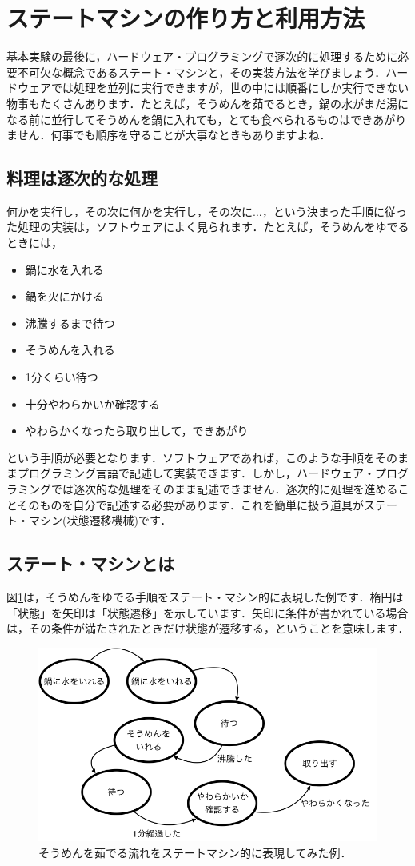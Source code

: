 \documentclass[a4paper,dvipdfmx]{jsarticle}
\begin{document}
\section{ステートマシンの作り方と利用方法}
基本実験の最後に，ハードウェア・プログラミングで逐次的に処理するために必要不可欠な概念であるステート・マシンと，その実装方法を学びましょう．ハードウェアでは処理を並列に実行できますが，世の中には順番にしか実行できない物事もたくさんあります．たとえば，そうめんを茹でるとき，鍋の水がまだ湯になる前に並行してそうめんを鍋に入れても，とても食べられるものはできあがりません．何事でも順序を守ることが大事なときもありますよね．

\subsection{料理は逐次的な処理}

何かを実行し，その次に何かを実行し，その次に...，という決まった手順に従った処理の実装は，ソフトウェアによく見られます．たとえば，そうめんをゆでるときには，
\begin{itemize}
 \item 鍋に水を入れる
 \item 鍋を火にかける
 \item 沸騰するまで待つ
 \item そうめんを入れる
 \item 1分くらい待つ
 \item 十分やわらかいか確認する
 \item やわらかくなったら取り出して，できあがり
\end{itemize}
という手順が必要となります．ソフトウェアであれば，このような手順をそのままプログラミング言語で記述して実装できます．しかし，ハードウェア・プログラミングでは逐次的な処理をそのまま記述できません．逐次的に処理を進めることそのものを自分で記述する必要があります．これを簡単に扱う道具がステート・マシン(状態遷移機械)です．

\subsection{ステート・マシンとは}
図\ref{fig:statemachine_example}は，そうめんをゆでる手順をステート・マシン的に表現した例です．楕円は「状態」を矢印は「状態遷移」を示しています．矢印に条件が書かれている場合は，その条件が満たされたときだけ状態が遷移する，ということを意味します．

 \begin{figure}[H]
  \begin{center}
   \includegraphics[width=.6\textwidth]{chapter05_figures/statemachine_example.png}
  \end{center}  
  \caption{そうめんを茹でる流れをステートマシン的に表現してみた例．\label{fig:statemachine_example}}
 \end{figure}
\end{document}
